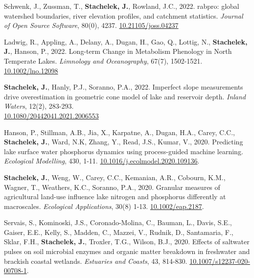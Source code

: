 \item Schwenk, J., Zussman, T., \textbf{Stachelek, J.}, Rowland, J.C., 2022. rabpro: global watershed boundaries, river elevation profiles, and catchment statistics. \emph{Journal of Open Source Software}, 80(0), 4237. \href{https://doi.org/10.21105/joss.04237}{10.21105/joss.04237}

\item Ladwig, R., Appling, A., Delany, A., Dugan, H., Gao, Q., Lottig, N., \textbf{Stachelek, J.}, Hanson, P., 2022. Long-term Change in Metabolism Phenology in North Temperate Lakes. \emph{Limnology and Oceanography}, 67(7), 1502-1521. \href{https://doi.org/10.1002/lno.12098}{10.1002/lno.12098}

\item \textbf{Stachelek, J.}, Hanly, P.J., Soranno, P.A., 2022. Imperfect slope measurements drive overestimation in geometric cone model of lake and reservoir depth. \emph{Inland Waters}, 12(2), 283-293. \\ \href{https://doi.org/10.1080/20442041.2021.2006553}{10.1080/20442041.2021.2006553}

\item Hanson, P., Stillman, A.B., Jia, X., Karpatne, A., Dugan, H.A., Carey, C.C., \textbf{Stachelek, J.}, Ward, N.K, Zhang, Y., Read, J.S., Kumar, V., 2020. Predicting lake surface water phosphorus dynamics using process-guided machine learning. \emph{Ecological Modelling}, 430, 1-11. \href{https://doi.org/10.1016/j.ecolmodel.2020.109136}{10.1016/j.ecolmodel.2020.109136}. %

\item \textbf{Stachelek, J.}, Weng, W., Carey, C.C., Kemanian, A.R., Cobourn, K.M., Wagner, T., Weathers, K.C., Soranno, P.A., 2020. Granular measures of agricultural land-use influence lake nitrogen and phosphorus differently at macroscales. \emph{Ecological Applications}, 30(8) 1-13. \href{https://doi.org/10.1002/eap.2187}{10.1002/eap.2187}. %

\item Servais, S., Kominoski, J.S., Coronado-Molina, C., Bauman, L., Davis, S.E., Gaiser, E.E., Kelly, S., Madden, C., Mazzei, V., Rudnik, D., Santamaria, F., Sklar, F.H., \textbf{Stachelek, J.}, Troxler, T.G., Wilson, B.J., 2020. Effects of saltwater pulses on soil microbial enzymes and organic matter breakdown in freshwater and brackish coastal wetlands. \emph{Estuaries and Coasts}, 43, 814-830. \href{https://doi.org/10.1007/s12237-020-00708-1}{10.1007/s12237-020-00708-1}. %

